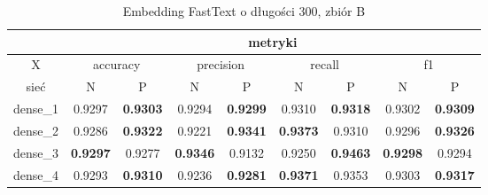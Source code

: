\begin{table}[p]  \centering
    \caption{\label{wyniki_eksperymentow_eks_1b}Embedding FastText o długości 300, zbiór B}
    \label{tab:wyniki_fasttext_B}
    \begin{tabular} {|c|c|c|c|c|c|c|c|c| }    \hline
                 & \multicolumn{8}{c|}{metryki}                                                                                                                                                                                                                                                \\ \hline
        X        & \multicolumn{2}{c|}{accuracy} & \multicolumn{2}{c|}{precision}      & \multicolumn{2}{c|}{recall}    & \multicolumn{2}{c|}{f1}                                                                                                                                              \\ \hline
        sieć     & N                             & P                                   & N                              & P                              & N                          & P                                   & N                          & P                                   \\ \hline
        dense\_1 & 0.9297                        & \textbf{0.9303}                     & 0.9294                         & \textbf{0.9299}                & 0.9310                     & \textbf{0.9318}                     & 0.9302                     & \textbf{0.9309}                     \\ \hline
        dense\_2 & 0.9286                        & \textbf{0.9322}                     & 0.9221                         & \textbf{0.9341}                & \textbf{0.9373}            & 0.9310                              & 0.9296                     & \textbf{0.9326}                     \\ \hline
        dense\_3 & \textbf{0.9297}               & 0.9277                              & \textbf{0.9346}                & 0.9132                         & 0.9250                     & \textbf{0.9463}                     & \textbf{0.9298}            & 0.9294                              \\ \hline
        dense\_4 & 0.9293                        & \textbf{0.9310}                     & 0.9236                         & \textbf{0.9281}                & \textbf{0.9371}            & 0.9353                              & 0.9303                     & \textbf{0.9317}                     \\ \hline

\end{tabular}
\end{table}
